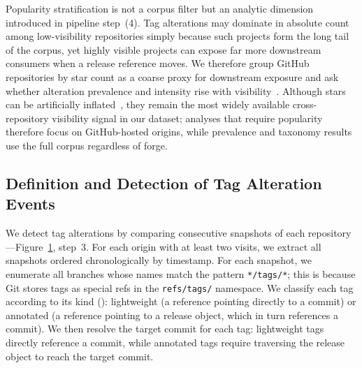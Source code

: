Popularity stratification is not a corpus filter but an analytic dimension introduced in pipeline step~(4).
Tag alterations may dominate in absolute count among low-visibility repositories simply because such projects form the long tail of the corpus, yet highly visible projects can expose far more downstream consumers when a release reference moves.
We therefore group GitHub repositories by star count as a coarse proxy for downstream exposure and ask whether alteration prevalence and intensity rise with visibility~\cite{borges-2016-github-stars}.
Although stars can be artificially inflated~\cite{DBLP:journals/corr/abs-2412-13459}, they remain the most widely available cross-repository visibility signal in our dataset; analyses that require popularity therefore focus on GitHub-hosted origins, while prevalence and taxonomy results use the full \SWH corpus regardless of forge.

\begin{figure}[t]
\centering
\def\svgwidth{0.92\linewidth}

\label{fig:tags-workflow-pipeline}
\end{figure}

\subsection{Definition and Detection of Tag Alteration Events}
\label{subsec:tags-def}

We detect tag alterations by comparing consecutive snapshots of each repository---Figure~\ref{fig:tags-workflow-pipeline}, step~3.
For each \SWH origin with at least two visits, we extract all snapshots ordered chronologically by timestamp.
For each snapshot, we enumerate all branches whose names match the pattern \texttt{*/tags/*}; this is because Git stores tags as special refs in the \texttt{refs/tags/} namespace.
We classify each tag according to its kind (): lightweight (a reference pointing directly to a commit) or annotated (a reference pointing to a release object, which in turn references a commit).
We then resolve the target commit for each tag: lightweight tags directly reference a commit, while annotated tags require traversing the release object to reach the target commit.

